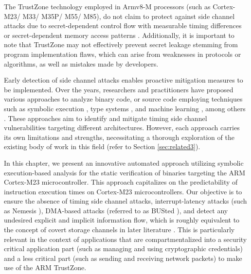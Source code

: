 The TrustZone technology employed in Armv8-M processors (such as
Cortex-M23/ M33/ M35P/ M55/ M85), do not claim to protect against side
channel attacks due to secret-dependent control flow with measurable timing
differences or secret-dependent memory access patterns \cite{armdeveloper}.
Additionally, it is important to note that TrustZone may not effectively
prevent secret leakage stemming from program implementation flaws, which
can arise from weaknesses in protocols or algorithms, as well as mistakes
made by developers. 


Early detection of side channel attacks enables proactive mitigation
measures to be implemented. Over the years, researchers and practitioners
have proposed various approaches to analyze binary code, or source code
employing techniques such as symbolic execution \cite{binsec, pitchfork},
type systems \cite{scfmsp, MantelAVR, Agat, barthe2014system}, and machine
learning \cite{MLforSC}, among others \cite{timingattack}. These approaches
aim to identify and mitigate timing side channel vulnerabilities targeting
different architectures. However, each approach carries its own limitations
and strengths, necessitating a thorough exploration of the existing body of
work in this field (refer to Section \ref{sec:related3}).

In this chapter, we present an innovative automated approach utilizing symbolic execution-based analysis for the static verification of binaries targeting the ARM Cortex-M23 microcontroller. This approach capitalizes on the predictability of instruction execution times on Cortex-M23 microcontrollers. Our objective is to ensure the absence of timing side channel attacks, interrupt-latency attacks (such as Nemesis \cite{Nemesis}), DMA-based attacks (referred to as BUSted \cite{busted}), and detect any undesired explicit and implicit information flow, which is roughly equivalent to the concept of covert storage channels in later literature \cite{storagechannel}. This is particularly relevant in the context of applications that are compartmentalized into a security critical application part (such as managing and using cryptographic credentials) and a less critical part (such as sending and receiving network packets) to make use of the ARM TrustZone. 

